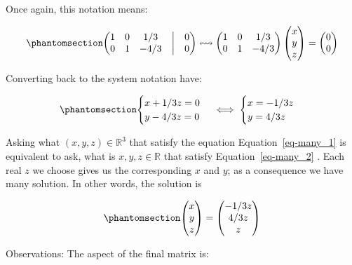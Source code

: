 \documentclass[
  letterpaper,
  DIV=11,
  numbers=noendperiod]{scrartcl}
\theoremstyle{definition}
\theoremstyle{remark}
\begin{document}
Once again, this notation means:

\begin{equation}\phantomsection\label{eq-ex4}{
\begin{pmatrix}1 & 0 & 1/3 &\bigm| & 0\\0 & 1 & -4/3 &\bigm| & 0\end{pmatrix} 
\leftrightsquigarrow 
\begin{pmatrix}1 & 0 & 1/3\\0 & 1 & -4/3 \end{pmatrix}
\begin{pmatrix}x\\y\\z\end{pmatrix}
=
\begin{pmatrix}0\\0\end{pmatrix}
}\end{equation}

Converting back to the system notation have:

\begin{equation}\phantomsection\label{eq-many_2}{
\begin{cases}
x+1/3z =0\\
y-4/3z=0
\end{cases} 
\iff
\begin{cases}
x=-1/3z\\
y=4/3z
\end{cases}
}\end{equation}

Asking what \((x,y,z)\in \mathbb{R}^3\) that satisfy the equation
Equation~\ref{eq-many_1} is equivalent to ask, what is
\(x,y,z\in \mathbb{R}\) that satisfy Equation~\ref{eq-many_2} . Each
real \(z\) we choose gives us the corresponding \(x\) and \(y\); as a
consequence we have many solution. In other words, the solution is

\begin{equation}\phantomsection\label{eq-parameter_dep_sol}{
\begin{pmatrix}
x\\
y\\
z
\end{pmatrix}
=
\begin{pmatrix}
-1/3z\\
4/3z\\
z
\end{pmatrix}
}\end{equation}

Observations: The aspect of the final matrix is:
\end{document}
